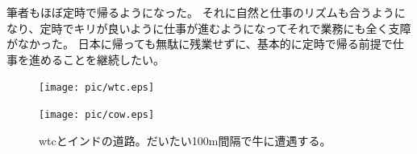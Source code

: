 筆者もほぼ定時で帰るようになった。
それに自然と仕事のリズムも合うようになり、定時でキリが良いように仕事が進むようになってそれで業務にも全く支障がなかった。
日本に帰っても無駄に残業せずに、基本的に定時で帰る前提で仕事を進めることを継続したい。
\begin{figure}[ht]
  \begin{minipage}{0.5\hsize}
  \begin{center}
    \texttt{[image: pic/wtc.eps]}
  \end{center}
  \end{minipage}
  \begin{minipage}{0.5\hsize}
  \begin{center}
    \texttt{[image: pic/cow.eps]}
  \end{center}
  \end{minipage}
  \caption{\acrshort{wtc}とインドの道路。だいたい100m間隔で牛に遭遇する。}
  \label{wtc}
\end{figure}
